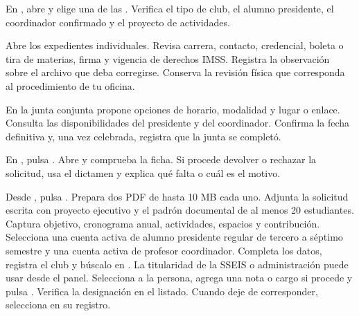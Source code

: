 \begin{pasos}
\item En , abre  y elige una de las . Verifica el tipo de club, el alumno presidente, el coordinador confirmado y el proyecto de actividades.
\item Abre los expedientes individuales. Revisa carrera, contacto, credencial, boleta o tira de materias, firma y vigencia de derechos IMSS. Registra la observación sobre el archivo que deba corregirse. Conserva la revisión física que corresponda al procedimiento de tu oficina.
\item En la junta conjunta propone opciones de horario, modalidad y lugar o enlace. Consulta las disponibilidades del presidente y del coordinador. Confirma la fecha definitiva y, una vez celebrada, registra que la junta se completó.
\item En , pulsa . Abre  y comprueba la ficha. Si procede devolver o rechazar la solicitud, usa el dictamen y explica qué falta o cuál es el motivo.
\end{pasos}
Desde , pulsa . Prepara dos PDF de hasta 10 MB cada uno. Adjunta la solicitud escrita con proyecto ejecutivo y el padrón documental de al menos 20 estudiantes. Captura objetivo, cronograma anual, actividades, espacios y contribución. Selecciona una cuenta activa de alumno presidente regular de tercero a séptimo semestre y una cuenta activa de profesor coordinador. Completa los datos, registra el club y búscalo en .
La titularidad de la SSEIS o administración puede usar  desde el panel. Selecciona a la persona, agrega una nota o cargo si procede y pulsa . Verifica la designación en el listado. Cuando deje de corresponder, selecciona  en su registro.

